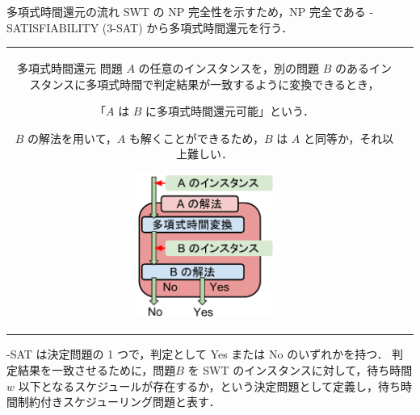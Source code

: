 \documentclass[dvipdfmx]{beamer}
\begin{document}
    \begin{frame}{多項式時間還元の流れ}
      SWT の NP 完全性を示すため，NP 完全である {-SATISFIABILITY (3-SAT)} から\alert{多項式時間還元}を行う．
      \begin{tabular}{cc}
        \begin{minipage}[]{0.6\hsize}
          \begin{block}{多項式時間還元}
            問題 $A$ の任意のインスタンスを，別の問題 $B$ のあるインスタンスに多項式時間で判定結果が一致するように変換できるとき，
            \begin{center}
              「$A$ は $B$ に多項式時間還元可能」という．
            \end{center}
            $B$ の解法を用いて，$A$ も解くことができるため，$B$ は $A$ と同等か，それ以上難しい．
          \end{block}
        \end{minipage}
        \begin{minipage}[]{0.4\hsize}
          \begin{figure}[h]
            \centering
            \includegraphics[width=4.5cm]{figure/reduction.pdf}
          \end{figure}
        \end{minipage}
        \vspace{5mm}
      \end{tabular}
      \vspace{-7mm}
      \begin{block}{}
        {-SAT} は決定問題の 1 つで，判定として Yes または No のいずれかを持つ．
        判定結果を一致させるために，問題$B$ を SWT のインスタンスに対して，待ち時間 $w$ 以下となるスケジュールが存在するか，という決定問題として定義し，\alert{待ち時間制約付きスケジューリング問題}と表す．
      \end{block}
    \end{frame}
\end{document}
